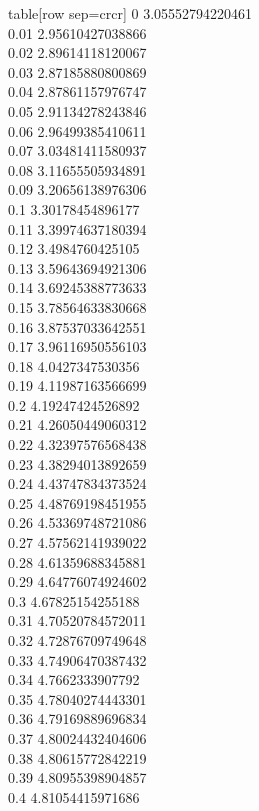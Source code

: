  table[row sep=crcr]{%
0	3.05552794220461\\
0.01	2.95610427038866\\
0.02	2.89614118120067\\
0.03	2.87185880800869\\
0.04	2.87861157976747\\
0.05	2.91134278243846\\
0.06	2.96499385410611\\
0.07	3.03481411580937\\
0.08	3.11655505934891\\
0.09	3.20656138976306\\
0.1	3.30178454896177\\
0.11	3.39974637180394\\
0.12	3.4984760425105\\
0.13	3.59643694921306\\
0.14	3.69245388773633\\
0.15	3.78564633830668\\
0.16	3.87537033642551\\
0.17	3.96116950556103\\
0.18	4.0427347530356\\
0.19	4.11987163566699\\
0.2	4.19247424526892\\
0.21	4.26050449060312\\
0.22	4.32397576568438\\
0.23	4.38294013892659\\
0.24	4.43747834373524\\
0.25	4.48769198451955\\
0.26	4.53369748721086\\
0.27	4.57562141939022\\
0.28	4.61359688345881\\
0.29	4.64776074924602\\
0.3	4.67825154255188\\
0.31	4.70520784572011\\
0.32	4.72876709749648\\
0.33	4.74906470387432\\
0.34	4.7662333907792\\
0.35	4.78040274443301\\
0.36	4.79169889696834\\
0.37	4.80024432404606\\
0.38	4.80615772842219\\
0.39	4.80955398904857\\
0.4	4.81054415971686\\
}
